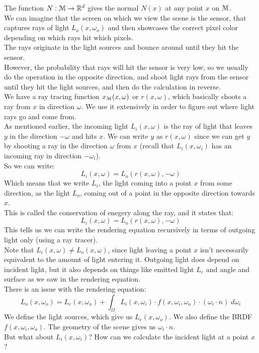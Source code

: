 \documentclass[12pt]{article}
\begin{document}
The function $N:\mathcal{M} \to \mathbb{R}^d$
gives the normal $N(x)$ at any point $x$ on $\mathcal{M}$. \\

We can imagine that the screen on which we view the
scene is the sensor, that captures rays of light 
$L_o(x, \omega_o)$ and then showcases the correct pixel
color depending on which rays hit which pixels. \\
The rays originate in the light sources and bounce around
until they hit the sensor. \\
However, the probability that rays will hit the sensor
is very low, so we usually do the operation in the
opposite direction, and shoot light rays from the sensor
until they hit the light sources,
and then do the calculation in reverse. \\

We have a ray tracing function $x_{\mathcal{M}}(x, \omega)$
or $r(x, \omega)$, which basically shoots a ray
from $x$ in direction $\omega$. We use it extensively
in order to figure out where light rays go and come from. \\

As mentioned earlier, the incoming light $L_i(x, \omega)$
is the ray of light that leaves $y$ in the direction $-\omega$
and hits $x$.
We can write $y$ as $r(x,\omega)$
since we can get $y$ by shooting a ray in the direction
$\omega$ from $x$ (recall that $L_i(x, \omega_i)$
has an incoming ray in direction $-\omega_i$). \\
So we can write:
\[ L_i(x, \omega) = L_o(r(x, \omega), -\omega) \]
Which means that we write $L_i$,
the light coming into a point $x$ from some direction,
as the light $L_o$, coming out of a point in
the opposite direction towards $x$. \\

This is called the conservation of enegery along the ray,
and it states that:
\[ L_i(x, \omega) = L_o(r(x, \omega), -\omega) \]
This tells us we can write the rendering equation recursively
in terms of outgoing light only (using a ray tracer). \\

Note that $L_i(x, \omega) \neq L_o(x, \omega)$,
since light leaving a point $x$ isn't
necessarily equivalent to the amount of light
entering it.
Outgoing light does depend on incident light,
but it also depends on things like emitted light $L_e$
and angle and surface as we saw in 
the rendering equation. \\

There is an issue with the rendering equation:
\[ L_{o}(x, \omega_o)
= L_{e}(x, \omega_o)
+ \int_\Omega L_{i}(x, \omega_i) \cdot
f(x, \omega_i, \omega_o) \cdot
(\omega_i \cdot n) \; d\omega_i \]
We define the light sources, 
which give us $L_{e}(x, \omega_o)$.
We also define the BRDF $f(x, \omega_i, \omega_o)$.
The geometry of the scene gives us $\omega_i \cdot n$. \\
But what about $L_{i}(x, \omega_i)$?
How can we calculate the incident light
at a point $x$? \\
\end{document}
